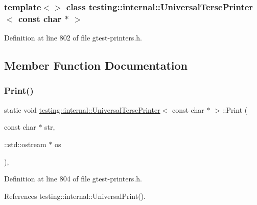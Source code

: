 \subsubsection*{template$<$$>$\newline
class testing\+::internal\+::\+Universal\+Terse\+Printer$<$ const char $\ast$ $>$}



Definition at line 802 of file gtest-\/printers.\+h.



\subsection{Member Function Documentation}
\mbox{\label{classtesting_1_1internal_1_1UniversalTersePrinter_3_01const_01char_01_5_01_4_a37a3be2d26dc07b24d16c2b5eb88ecda}} 
\subsubsection{\texorpdfstring{Print()}{Print()}}
{\footnotesize\ttfamily static void \hyperlink{classtesting_1_1internal_1_1UniversalTersePrinter}{testing\+::internal\+::\+Universal\+Terse\+Printer}$<$ const char $\ast$ $>$\+::Print (\begin{DoxyParamCaption}\item[{const char $\ast$}]{str,  }\item[{\+::std\+::ostream $\ast$}]{os }\end{DoxyParamCaption})\hspace{0.3cm}{\ttfamily [inline]}, {\ttfamily [static]}}



Definition at line 804 of file gtest-\/printers.\+h.



References testing\+::internal\+::\+Universal\+Print().


